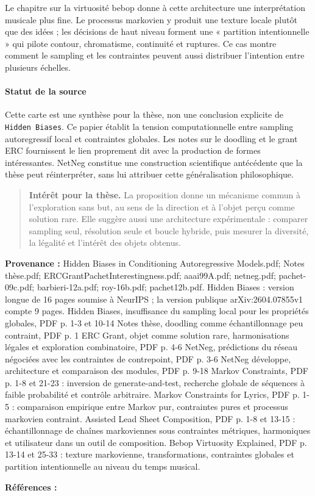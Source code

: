 \documentclass[10pt,a4paper]{article}
\begin{document}
Le chapitre sur la virtuosité bebop donne à cette architecture une interprétation musicale plus fine. Le processus markovien y produit une texture locale plutôt que des idées ; les décisions de haut niveau forment une « partition intentionnelle » qui pilote contour, chromatisme, continuité et ruptures. Ce cas montre comment le sampling et les contraintes peuvent aussi distribuer l'intention entre plusieurs échelles.

\paragraph{Statut de la source}
Cette carte est une synthèse pour la thèse, non une conclusion explicite de \texttt{Hidden Biases}. Ce papier établit la tension computationnelle entre sampling autoregressif local et contraintes globales. Les notes sur le doodling et le grant ERC fournissent le lien proprement dit avec la production de formes intéressantes. NetNeg constitue une construction scientifique antécédente que la thèse peut réinterpréter, sans lui attribuer cette généralisation philosophique.

\begin{quote}
\textbf{Intérêt pour la thèse.} La proposition donne un mécanisme commun à l'exploration sans but, au sens de la direction et à l'objet perçu comme solution rare. Elle suggère aussi une architecture expérimentale : comparer sampling seul, résolution seule et boucle hybride, puis mesurer la diversité, la légalité et l'intérêt des objets obtenus.
\end{quote}
{\footnotesize\color{metadata}\textbf{Provenance :} Hidden Biases in Conditioning Autoregressive Models.pdf; Notes thèse.pdf; ERCGrantPachetInterestingness.pdf; aaai99A.pdf; netneg.pdf; pachet-09c.pdf; barbieri-12a.pdf; roy-16b.pdf; pachet12b.pdf. Hidden Biases : version longue de 16 pages soumise à NeurIPS ; la version publique arXiv:2604.07855v1 compte 9 pages. Hidden Biases, insuffisance du sampling local pour les propriétés globales, PDF p. 1-3 et 10-14 Notes thèse, doodling comme échantillonnage peu contraint, PDF p. 1 ERC Grant, objet comme solution rare, harmonisations légales et exploration combinatoire, PDF p. 4-6 NetNeg, prédictions du réseau négociées avec les contraintes de contrepoint, PDF p. 3-6 NetNeg développe, architecture et comparaison des modules, PDF p. 9-18 Markov Constraints, PDF p. 1-8 et 21-23 : inversion de generate-and-test, recherche globale de séquences à faible probabilité et contrôle arbitraire. Markov Constraints for Lyrics, PDF p. 1-5 : comparaison empirique entre Markov pur, contraintes pures et processus markovien contraint. Assisted Lead Sheet Composition, PDF p. 1-8 et 13-15 : échantillonnage de chaînes markoviennes sous contraintes métriques, harmoniques et utilisateur dans un outil de composition. Bebop Virtuosity Explained, PDF p. 13-14 et 25-33 : texture markovienne, transformations, contraintes globales et partition intentionnelle au niveau du temps musical.\par}
{\footnotesize\color{metadata}\textbf{Références :} \parencite{pachet2026biases,goldman1999netneg,pachet2011markov,barbieri2012lyrics,papadopoulos2016flowcomposer,pachet2012virtuosity}\par}
\end{document}
